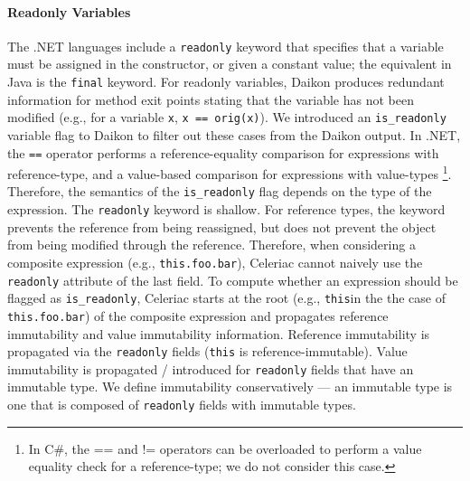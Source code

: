 \paragraph{Readonly Variables}

The .NET languages include a \verb|readonly| keyword that specifies
that a variable must be assigned in the constructor, or given a
constant value; the equivalent in Java is the \verb|final|
keyword.
%
For readonly variables, Daikon produces redundant information for
method exit points stating that the variable has not been modified
(e.g., for a variable \verb|x|, \verb|x == orig(x)|).
%
We introduced an \verb|is_readonly| variable flag to Daikon to filter
out these cases from the Daikon output.
%
In .NET, the \verb|==| operator performs a reference-equality
comparison for expressions with reference-type, and a value-based
comparison for expressions with value-types
%
\footnote{In C\#, the == and != operators can be
  overloaded to perform a value equality check for a reference-type;
  we do not consider this case.}.
%
Therefore, the semantics of the \verb|is_readonly| flag depends on the
type of the expression.
%
The \verb|readonly| keyword is shallow. For reference types, the
keyword prevents the reference from being reassigned, but does not
prevent the object from being modified through the reference.
%
Therefore, when considering a composite expression (e.g.,
\verb|this.foo.bar|), Celeriac cannot naively use the \verb|readonly|
attribute of the last field.
%
To compute whether an expression should be flagged as
\verb|is_readonly|, Celeriac starts at the root (e.g., \verb|this|in
the the case of \verb|this.foo.bar|) of the composite expression and
propagates reference immutability and value immutability
information. Reference immutability is propagated via the
\verb|readonly| fields (\verb|this| is reference-immutable). Value
immutability is propagated / introduced for \verb|readonly| fields
that have an immutable type. We define immutability conservatively ---
an immutable type is one that is composed of \verb|readonly| fields
with immutable types.


